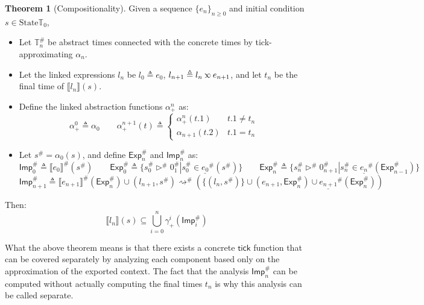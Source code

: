 \documentclass[acmsmall,review]{acmart}\settopmatter{printfolios=true,printccs=false,printacmref=false}
\theoremstyle{definition}
\newtheorem{thm}{Theorem}[section]
\newcommand*{\A}[1]{{#1}^{\#}}
\newcommand*{\Time}{\mathbb{T}}
\newcommand*{\ATime}{\A{\Time}}
\newcommand*{\State}{\text{State}}
\newcommand*{\semarrow}{\rightsquigarrow}
\newcommand*{\semlink}{\mathbin{\rotatebox[origin=c]{180}{$\propto$}}}
\newcommand*{\link}[2]{{#1}\semlink{#2}}
\newcommand*{\Exp}{\mathsf{Exp}}
\newcommand*{\Imp}{\mathsf{Imp}}
\newcommand*{\sembracket}[1]{\lBrack{#1}\rBrack}
\newcommand*{\tick}{\mathsf{tick}}
\begin{document}
\begin{thm}[Compositionality]
  Given a sequence $\{e_n\}_{n\ge 0}$ and initial condition $s\in\State{\Time_0}$,

  \begin{itemize}
    \item Let $\ATime_n$ be abstract times connected with the concrete times by tick-approximating $\alpha_n$.
    \item Let the linked expressions $l_n$ be $l_0\triangleq e_0$, $l_{n+1}\triangleq\link{l_n}{e_{n+1}}$, and let $t_n$ be the final time of $\sembracket{l_n}(s)$.
    \item Define the linked abstraction functions $\alpha^{n}_+$ as:
          \[
            \alpha^0_+\triangleq\alpha_0
            \qquad
            \alpha^{n+1}_+(t)\triangleq
            \begin{cases}
              \alpha^n_+(t.1)   & t.1\neq t_n \\
              \alpha_{n+1}(t.2) & t.1=t_n
            \end{cases}
          \]
    \item Let $\A{s}=\alpha_0(s)$, and define $\A\Exp_n$ and $\A\Imp_n$ as:
          \[
            \A\Imp_0\triangleq\A{\sembracket{e_0}}(\A{s})\qquad
            \A\Exp_0\triangleq\{\A{s}_0\A\rhd\A{0}_1|\A{s}_0\in\A{\underline{e_0}}(\A{s})\}\qquad
            \A\Exp_{n}\triangleq\{\A{s}_n\A\rhd\A{0}_{n+1}|\A{s}_{n}\in\A{\underline{e_{n}}}(\A\Exp_{n-1})\}
          \]
          \[
            \A\Imp_{n+1}\triangleq\A{\sembracket{e_{n+1}}}(\A\Exp_n)\cup(l_{n+1},\A{s})\A\semarrow(\{(l_n,\A{s})\}\cup(e_{n+1},\A\Exp_n)\cup\A{\underline{e_{n+1}}}(\A\Exp_{n}))
          \]
  \end{itemize}

  Then:
  \[
    \sembracket{l_n}(s)\subseteq\bigcup_{i=0}^{n}{\gamma^i_+(\A\Imp_i)}
  \]
\end{thm}

What the above theorem means is that there exists a concrete $\tick$ function that can be covered separately by analyzing each component based only on the approximation of the exported context.
The fact that the analysis $\A\Imp_n$ can be computed without actually computing the final times $t_n$ is why this analysis can be called separate.


\end{document}
